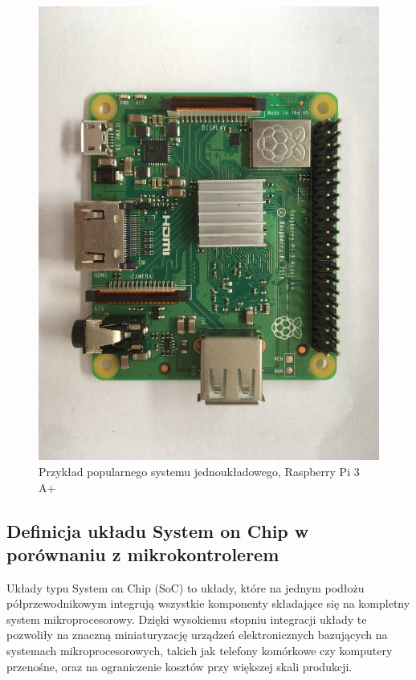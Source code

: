 \begin{figure}[H]
	\centering
	\includegraphics[angle=90,scale=0.3,trim={2cm 0 2cm 0},clip]{soc-theory/photo_2022-09-16_13-47-40.jpg}
	\caption{Przykład popularnego systemu jednoukładowego, Raspberry Pi 3 A+}
	\label{fig:rpi3a-photo}
\end{figure}

\subsection{Definicja układu System on Chip w porównaniu z mikrokontrolerem}

Układy typu System on Chip (SoC) to układy, które na jednym podłożu półprzewodnikowym integrują wszystkie komponenty składające się na kompletny system mikroprocesorowy. Dzięki wysokiemu stopniu integracji układy te pozwoliły na znaczną miniaturyzację urządzeń elektronicznych bazujących na systemach mikroprocesorowych, takich jak telefony komórkowe czy komputery przenośne, oraz na ograniczenie kosztów przy większej skali produkcji.

